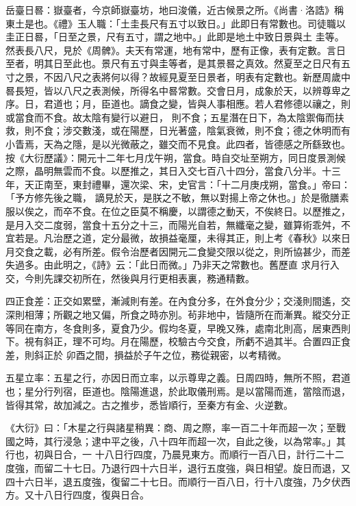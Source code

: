 \begin{pinyinscope}
 岳臺日晷：嶽臺者，今京師嶽臺坊，地曰浚儀，近古候景之所。《尚書·洛誥》稱東土是也。《禮》玉人職：「土圭長尺有五寸以致日。」此即日有常數也。司徒職以圭正日晷，「日至之景，尺有五寸，謂之地中。」此即是地土中致日景與土
 圭等。然表長八尺，見於《周髀》。夫天有常運，地有常中，歷有正像，表有定數。言日至者，明其日至此也。景尺有五寸與圭等者，是其景晷之真效。然夏至之日尺有五寸之景，不因八尺之表將何以得？故經見夏至日景者，明表有定數也。新歷周歲中晷長短，皆以八尺之表測候，所得名中晷常數。交會日月，成象於天，以辨尊卑之序。日，君道也；月，臣道也。謫食之變，皆與人事相應。若人君修德以禳之，則或當食而不食。故太陰有變行以避日，
 則不食；五星潛在日下，為太陰禦侮而扶救，則不食；涉交數淺，或在陽歷，日光著盛，陰氣衰微，則不食；德之休明而有小眚焉，天為之隱，是以光微蔽之，雖交而不見食。此四者，皆德感之所繇致也。按《大衍歷議》：開元十二年七月戊午朔，當食。時自交址至朔方，同日度景測候之際，晶明無雲而不食。以歷推之，其日入交七百八十四分，當食八分半。十三年，天正南至，東封禮畢，還次梁、宋，史官言：「十二月庚戌朔，當食。」帝曰：「予方修先後之職，
 謫見於天，是朕之不敏，無以對揚上帝之休也。」於是徹膳素服以俟之，而卒不食。在位之臣莫不稱慶，以謂德之動天，不俟終日。以歷推之，是月入交二度弱，當食十五分之十三，而陽光自若，無纖毫之變，雖算術乖舛，不宜若是。凡治歷之道，定分最微，故損益毫厘，未得其正，則上考《春秋》以來日月交食之載，必有所差。假令治歷者因開元二食變交限以從之，則所協甚少，而差失過多。由此明之，《詩》云：「此日而微。」乃非天之常數也。舊歷直
 求月行入交，今則先課交初所在，然後與月行更相表裏，務通精數。



 四正食差：正交如累壁，漸減則有差。在內食分多，在外食分少；交淺則間遙，交深則相薄；所觀之地又偏，所食之時亦別。茍非地中，皆隨所在而漸異。縱交分正等同在南方，冬食則多，夏食乃少。假均冬夏，早晚又殊，處南北則高，居東西則下。視有斜正，理不可均。月在陽歷，校驗古今交食，所虧不過其半。合置四正食差，則斜正於
 卯酉之間，損益於子午之位，務從親密，以考精微。



 五星立率：五星之行，亦因日而立率，以示尊卑之義。日周四時，無所不照，君道也；星分行列宿，臣道也。陰陽進退，於此取儀刑焉。是以當陽而進，當陰而退，皆得其常，故加減之。古之推步，悉皆順行，至秦方有金、火逆數。



 《大衍》曰：「木星之行與諸星稍異：商、周之際，率一百二十年而超一次；至戰國之時，其行浸急；逮中平之後，八十四年而超一次，自此之後，以為常率。」其行也，初與日合，一
 十八日行四度，乃晨見東方。而順行一百八日，計行二十二度強，而留二十七日。乃退行四十六日半，退行五度強，與日相望。旋日而退，又四十六日半，退五度強，復留二十七日。而順行一百八日，行十八度強，乃夕伏西方。又十八日行四度，復與日合。




\end{pinyinscope}

